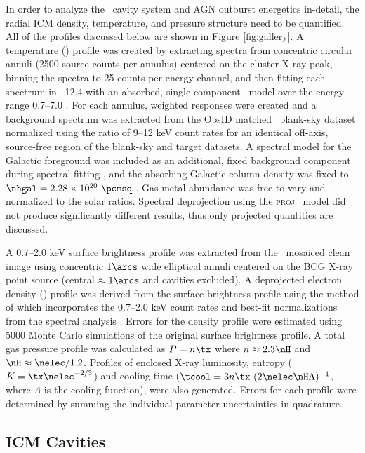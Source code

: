\documentclass[11pt, preprint]{aastex}
\begin{document}
In order to analyze the \rbs\ cavity system and AGN outburst
energetics in-detail, the radial ICM density, temperature, and
pressure structure need to be quantified. All of the profiles
discussed below are shown in Figure \ref{fig:gallery}. A temperature
(\tx) profile was created by extracting spectra from concentric
circular annuli (2500 source counts per annulus) centered on the
cluster X-ray peak, binning the spectra to 25 counts per energy
channel, and then fitting each spectrum in \xspec\ 12.4 \citep{xspec}
with an absorbed, single-component \mekal\ model \citep{mekal1} over
the energy range 0.7--7.0 \keV. For each annulus, weighted responses
were created and a background spectrum was extracted from the ObsID
matched \caldb\ blank-sky dataset normalized using the ratio of 9--12
keV count rates for an identical off-axis, source-free region of the
blank-sky and target datasets. A spectral model for the Galactic
foreground was included as an additional, fixed background component
during spectral fitting \citep[see][for method]{2005ApJ...628..655V,
  xrayband}, and the absorbing Galactic column density was fixed to
$\nhgal = 2.28 \times 10^{20} ~\pcmsq$ \citep{lab}. Gas metal
abundance was free to vary and normalized to the \citet{ag89} solar
ratios. Spectral deprojection using the {\textsc{proj}} \xspec\ model
did not produce significantly different results, thus only projected
quantities are discussed.

A 0.7--2.0 keV surface brightness profile was extracted from the
\cxo\ mosaiced clean image using concentric $1\arcs$ wide elliptical
annuli centered on the BCG X-ray point source (central $\approx
1\arcs$ and cavities excluded). A deprojected electron density
(\nelec) profile was derived from the surface brightness profile using
the method of \citet{kriss83} which incorporates the 0.7--2.0 keV
count rates and best-fit normalizations from the spectral analysis
\citep[see][for details]{accept}. Errors for the density profile were
estimated using 5000 Monte Carlo simulations of the original surface
brightness profile. A total gas pressure profile was calculated as $P
= n \tx$ where $n \approx 2.3 \nH$ and $\nH \approx
\nelec/1.2$. Profiles of enclosed X-ray luminosity, entropy ($K = \tx
\nelec^{-2/3}$) and cooling time ($\tcool = 3 n \tx~(2 \nelec \nH
\Lambda)^{-1}$, where $\Lambda$ is the cooling function), were also
generated. Errors for each profile were determined by summing the
individual parameter uncertainties in quadrature.

\subsection{ICM Cavities}
\label{sec:cavities}
\end{document}
